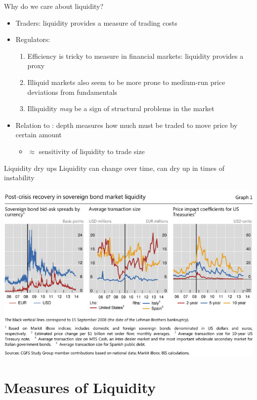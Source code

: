 \documentclass[english,10pt
,aspectratio=169
]{beamer}
\begin{document}
\begin{frame}{Why do we care about liquidity?}
\begin{itemize}
	\item Traders: liquidity provides a measure of trading costs
	\item Regulators:
	\begin{enumerate}
		\item Efficiency is tricky to measure in financial markets: liquidity provides a proxy
		\item Illiquid markets also seem to be more prone to medium-run price deviations from fundamentals
		\item Illiquidity \textit{may} be a sign of structural problems in the market
	\end{enumerate}
	\item Relation to : depth measures how much must be traded to move price by certain amount
	\begin{itemize}
		\item $\approx$ sensitivity of liquidity to trade size
	\end{itemize}
\end{itemize}
\end{frame}


\begin{frame}{Liquidity dry ups}
	Liquidity can change over time, can dry up in times of instability
	\begin{center}
		\includegraphics[scale=0.5]{pics/L2_liquiditylehman}
	\end{center}
\end{frame}



\section{Measures of Liquidity}
\end{document}
